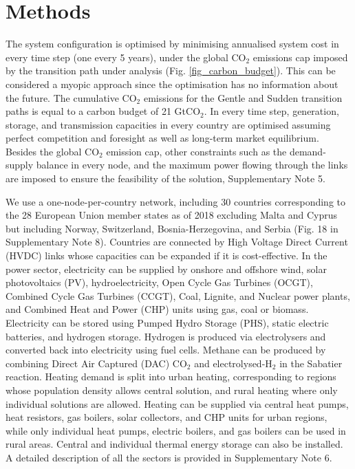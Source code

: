 \documentclass[5p]{elsarticle} %
\begin{document}

\FloatBarrier
\section{Methods}

The system configuration is optimised by minimising annualised system cost in every time step (one every 5 years), under the global CO$_2$ emissions cap imposed by the transition path under analysis (Fig. \ref{fig_carbon_budget}). This can be considered a myopic approach since the optimisation has no information about the future. The cumulative CO$_2$ emissions for the Gentle and Sudden transition paths is equal to a carbon budget of 21 GtCO$_2$. In every time step, generation, storage, and transmission capacities in every country are optimised assuming perfect competition and foresight as well as long-term market equilibrium. Besides the global CO$_2$ emission cap, other constraints such as the demand-supply balance in every node, and the maximum power flowing through the links are imposed to ensure the feasibility of the solution, Supplementary Note 5. \

We use a one-node-per-country network, including 30 countries corresponding to the 28 European Union member states as of 2018 excluding Malta and Cyprus but including Norway, Switzerland, Bosnia-Herzegovina, and Serbia (Fig. 18 in Supplementary Note 8). Countries are connected by High Voltage Direct Current (HVDC) links whose capacities can be expanded if it is cost-effective. In the power sector, electricity can be supplied by onshore and offshore wind, solar photovoltaics (PV), hydroelectricity, Open Cycle Gas Turbines (OCGT), Combined Cycle Gas Turbines (CCGT), Coal, Lignite, and Nuclear power plants, and Combined Heat and Power (CHP) units using gas, coal or biomass. Electricity can be stored using Pumped Hydro Storage (PHS), static electric batteries, and hydrogen storage. Hydrogen is produced via electrolysers and converted back into electricity using fuel cells. Methane can be produced by combining Direct Air Captured (DAC) CO$_2$ and electrolysed-H$_2$ in the Sabatier reaction. Heating demand is split into urban heating, corresponding to regions whose population density allows central solution, and rural heating where only individual solutions are allowed. Heating can be supplied via central heat pumps, heat resistors, gas boilers, solar collectors, and CHP units for urban regions, while only individual heat pumps, electric boilers, and gas boilers can be used in rural areas. Central and individual thermal energy storage can also be installed. A detailed description of all the sectors is provided in Supplementary Note 6. \
\end{document}
